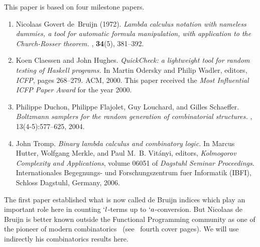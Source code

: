 \documentclass{sig-alternate}
\begin{document}
This paper is based on four milestone papers.
\begin{enumerate}[label=\roman*]
\item \cite{NGDeBruijn108} Nicolaas Govert de~Bruijn (1972).  \emph{Lambda calculus
    notation with nameless dummies, a tool for automatic formula manipulation, with
    application to the {Church-Rosser} theorem.}  , {\bf 34}(5), 381--392.
\item \cite{DBLP:conf/icfp/ClaessenH00} Koen Claessen and John Hughes.
  \emph{\textsf{QuickCheck}: a light\-weight tool for random testing of
    \textsf{Haskell} programs.}  \newblock In Martin Odersky and Philip Wadler,
  editors, {\em ICFP}, pages 268--279. ACM, 2000. This paper received the \emph{Most
    Influential ICFP Paper Award} for the year 2000.
\item \cite{DBLP:journals/cpc/DuchonFLS04} Philippe Duchon, Philippe Flajolet, Guy
  Louchard, and Gilles Schaeffer.  \emph{Boltzmann samplers for the random generation
    of combinatorial structures.}  , 13(4-5):577--625, 2004.
\item
  \begin{sloppypar}
    \cite{DBLP:conf/dagstuhl/Tromp06} John Tromp.  \emph{Binary lambda calculus and
      combinatory logic.}  \newblock In Marcus Hutter, Wolfgang Merkle, and Paul
    M.~B. Vit{\'a}nyi, editors, {\em Kolmogorov Complexity and Applications}, volume
    06051 of {\em Dagstuhl Seminar Proceedings}. Internationales Begegnungs- und
    Forschungszentrum fuer Informatik (IBFI), Schloss Dagstuhl, Germany, 2006.
  \end{sloppypar}

\end{enumerate}

The first paper established what is now called de Bruijn indices which play an
important role here in counting $`l$-terms up to $ `a$-conversion.  But Nicolaas de
Bruijn is better known outside the Functional Programming community as one of the
pioneer of modern combinatorics~\cite{bruijn58:_asymp_method_analy}
(see~\cite{knuth00:_selec_paper_analy_algor} fourth cover pages).  We will use
indirectly his combinatorics results here.
\end{document}
